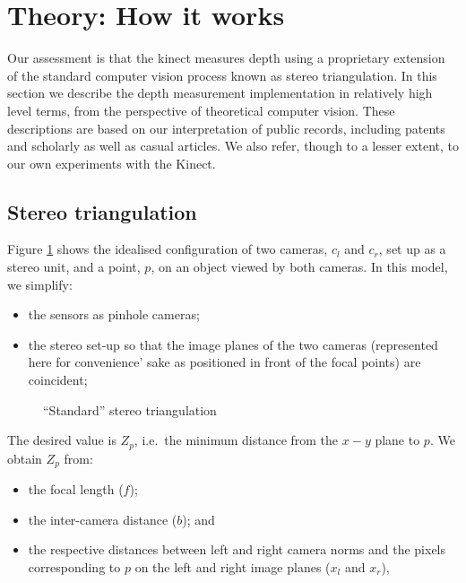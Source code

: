\section{Theory: How it works}
\label{howitworks}

Our assessment is that the kinect measures depth using a proprietary extension
of the standard computer vision process known as stereo triangulation. In this
section we describe the depth measurement implementation in relatively high
level terms, from the perspective of theoretical computer vision. These
descriptions are based on our interpretation of public records, including
patents and scholarly as well as casual articles. We also refer, though to a
lesser extent, to our own experiments with the Kinect.


\subsection{Stereo triangulation}
\label{sub:triang}

Figure \ref{fig:triang} shows the idealised configuration of two cameras,
$c_{l}$ and $c_{r}$, set up as a stereo unit, and a point, $p$, on an object
viewed by both cameras. In this model, we simplify: 

\begin{itemize}

    \item   the sensors as pinhole cameras;

    \item   the stereo set-up so that the image planes of the two cameras
            (represented here for convenience' sake as positioned in front of
            the focal points) are coincident;

\end{itemize}

\begin{figure}[ht]
    \begin{center}
        
        \caption{``Standard'' stereo triangulation}
        \label{fig:triang}
    \end{center}
\end{figure}

The desired value is $Z_{p}$, i.e.\ the minimum distance from the $x-y$ plane to
$p$. We obtain $Z_{p}$ from: 

\begin{itemize}

    \item the focal length ($f$);

    \item the inter-camera distance ($b$); and 

    \item the respective distances between left and right camera norms and the
    pixels corresponding to $p$ on the left and right image planes ($x_{l}$ and
    $x_{r}$),

\end{itemize}

